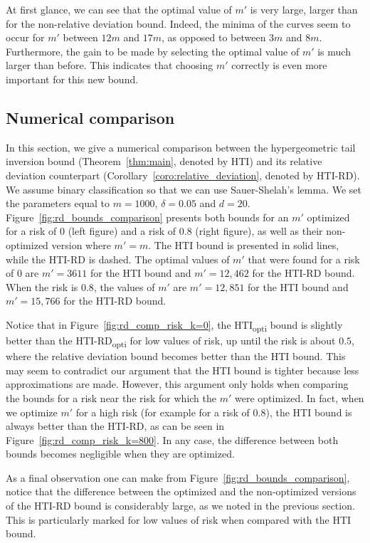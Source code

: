 \documentclass[twoside,11pt]{article}
\begin{document}
At first glance, we can see that the optimal value of $m'$ is very large, larger than for the non-relative deviation bound.
Indeed, the minima of the curves seem to occur for $m'$ between $12m$ and $17m$, as opposed to between $3m$ and $8m$.
Furthermore, the gain to be made by selecting the optimal value of $m'$ is much larger than before.
This indicates that choosing $m'$ correctly is even more important for this new bound.





\subsection{Numerical comparison}
\label{app:numerical_comparison}

In this section, we give a numerical comparison between the hypergeometric tail inversion bound (Theorem~\ref{thm:main}, denoted by HTI) and its relative deviation counterpart (Corollary~\ref{coro:relative_deviation}, denoted by HTI-RD).
We assume binary classification so that we can use Sauer-Shelah's lemma.
We set the parameters equal to $m=1000$, $\delta=0.05$ and $d=20$.
Figure~\ref{fig:rd_bounds_comparison} presents both bounds for an $m'$ optimized for a risk of $0$ (left figure) and a risk of $0.8$ (right figure), as well as their non-optimized version where $m'=m$.
The HTI bound is presented in solid lines, while the HTI-RD is dashed.
The optimal values of $m'$ that were found for a risk of 0 are $m'=3611$ for the HTI bound and $m'=12,462$ for the HTI-RD bound.
When the risk is $0.8$, the values of $m'$ are $m'=12,851$ for the HTI bound and $m'=15,766$ for the HTI-RD bound.

Notice that in Figure~\ref{fig:rd_comp_risk_k=0}, the HTI\textsubscript{opti} bound is slightly better than the HTI-RD\textsubscript{opti} for low values of risk, up until the risk is about $0.5$, where the relative deviation bound becomes better than the HTI bound.
This may seem to contradict our argument that the HTI bound is tighter because less approximations are made.
However, this argument only holds when comparing the bounds for a risk near the risk for which the $m'$ were optimized.
In fact, when we optimize $m'$ for a high risk (for example for a risk of $0.8$), the HTI bound is always better than the HTI-RD, as can be seen in Figure~\ref{fig:rd_comp_risk_k=800}.
In any case, the difference between both bounds becomes negligible when they are optimized.

As a final observation one can make from Figure~\ref{fig:rd_bounds_comparison}, notice that the difference between the optimized and the non-optimized versions of the HTI-RD bound is considerably large, as we noted in the previous section.
This is particularly marked for low values of risk when compared with the HTI bound.
\end{document}
